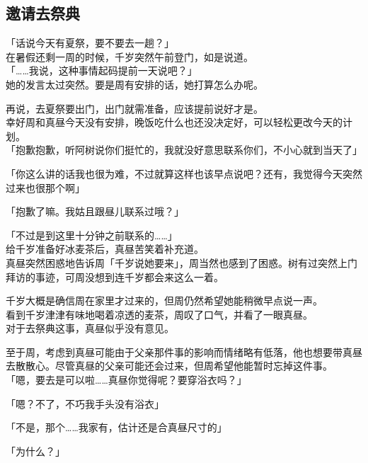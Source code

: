 \subsection{邀请去祭典}

「话说今天有夏祭，要不要去一趟？」\\

在暑假还剩一周的时候，千岁突然午前登门，如是说道。\\

「……我说，这种事情起码提前一天说吧？」\\

她的发言太过突然。要是周有安排的话，她打算怎么办呢。

再说，去夏祭要出门，出门就需准备，应该提前说好才是。\\

幸好周和真昼今天没有安排，晚饭吃什么也还没决定好，可以轻松更改今天的计划。\\

「抱歉抱歉，听阿树说你们挺忙的，我就没好意思联系你们，不小心就到当天了」

「你这么讲的话我也很为难，不过就算这样也该早点说吧？还有，我觉得今天突然过来也很那个啊」

「抱歉了嘛。我姑且跟昼儿联系过哦？」

「不过是到这里十分钟之前联系的……」\\

给千岁准备好冰麦茶后，真昼苦笑着补充道。\\

真昼突然困惑地告诉周「千岁说她要来」，周当然也感到了困惑。树有过突然上门拜访的事迹，可周没想到连千岁都会来这么一着。

千岁大概是确信周在家里才过来的，但周仍然希望她能稍微早点说一声。\\

看到千岁津津有味地喝着凉透的麦茶，周叹了口气，并看了一眼真昼。\\

对于去祭典这事，真昼似乎没有意见。

至于周，考虑到真昼可能由于父亲那件事的影响而情绪略有低落，他也想要带真昼去散散心。尽管真昼的父亲可能还会过来，但周希望他能暂时忘掉这件事。\\

「嗯，要去是可以啦……真昼你觉得呢？要穿浴衣吗？」

「嗯？不了，不巧我手头没有浴衣」

「不是，那个……我家有，估计还是合真昼尺寸的」

「为什么？」

